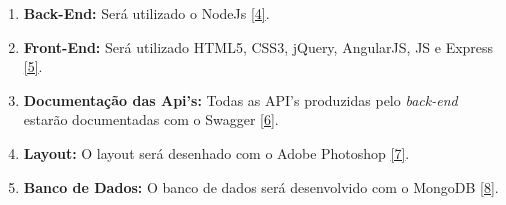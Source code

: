 
\begin{enumerate}
\item \textbf{Back-End:} Será utilizado o NodeJs \hyperref[nodejs]{[4]}.
\item \textbf{Front-End:} Será utilizado HTML5, CSS3, jQuery, AngularJS, JS e Express \hyperref[express]{[5]}.
\item \textbf{Documentação das Api's:} Todas as API's produzidas pelo \textit{back-end} estarão documentadas com o Swagger \hyperref[swagger]{[6]}.
\item \textbf{Layout:} O layout será desenhado com o Adobe Photoshop \hyperref[ps]{[7]}.
\item \textbf{Banco de Dados:} O banco de dados será desenvolvido com o MongoDB \hyperref[mongodb]{[8]}.

\end{enumerate}